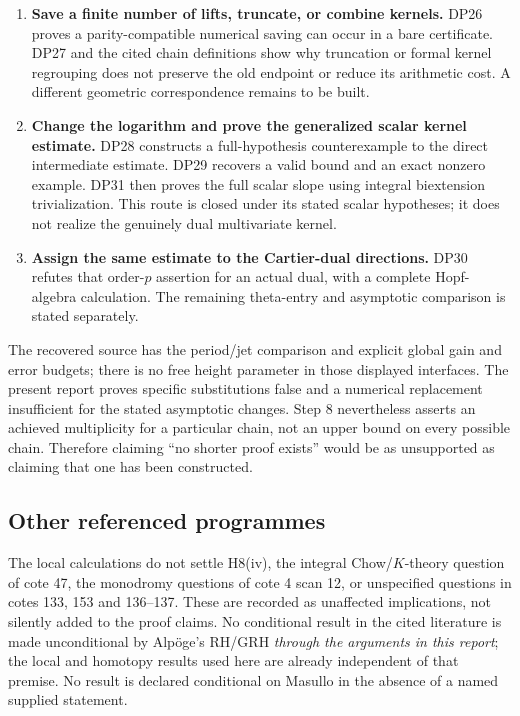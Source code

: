 \documentclass[11pt,a4paper]{article}
\theoremstyle{definition}\newtheorem{remark}[theorem]{Remark}
\begin{document}
\begin{enumerate}[leftmargin=*,label=\arabic*.]
\item \textbf{Save a finite number of lifts, truncate, or combine kernels.} DP26 proves a parity-compatible numerical saving can occur in a bare certificate. DP27 and the cited chain definitions show why truncation or formal kernel regrouping does not preserve the old endpoint or reduce its arithmetic cost. A different geometric correspondence remains to be built.
\item \textbf{Change the logarithm and prove the generalized scalar kernel estimate.} DP28 constructs a full-hypothesis counterexample to the direct intermediate estimate. DP29 recovers a valid bound and an exact nonzero example. DP31 then proves the full scalar slope using integral biextension trivialization. This route is closed under its stated scalar hypotheses; it does not realize the genuinely dual multivariate kernel.
\item \textbf{Assign the same estimate to the Cartier-dual directions.} DP30 refutes that order-$p$ assertion for an actual dual, with a complete Hopf-algebra calculation. The remaining theta-entry and asymptotic comparison is stated separately.
\end{enumerate}
The recovered source has the period/jet comparison and explicit global gain and error budgets; there is no free height parameter in those displayed interfaces. The present report proves specific substitutions false and a numerical replacement insufficient for the stated asymptotic changes. Step 8 nevertheless asserts an achieved multiplicity for a particular chain, not an upper bound on every possible chain. Therefore claiming ``no shorter proof exists'' would be as unsupported as claiming that one has been constructed.

\subsection{Other referenced programmes}

The local calculations do not settle H8(iv), the integral Chow/$K$-theory question of cote 47, the monodromy questions of cote 4 scan 12, or unspecified questions in cotes 133, 153 and 136--137. These are recorded as unaffected implications, not silently added to the proof claims. No conditional result in the cited literature is made unconditional by Alp\"oge's RH/GRH \emph{through the arguments in this report}; the local and homotopy results used here are already independent of that premise. No result is declared conditional on Masullo in the absence of a named supplied statement.
\end{document}
